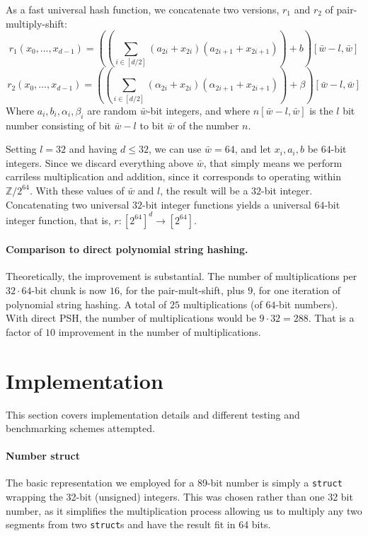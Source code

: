 \documentclass[]{article}
\newcommand{\funk}[1]{\small\texttt{#1}}
\begin{document}
As a fast universal hash function, we concatenate two versions, $r_1$ and $r_2$ of pair-multiply-shift:
\[r_1(x_0,\ldots ,x_{d-1}) = \left(\left(\sum_{i\in [d/2]}(a_{2i} + x_{2i})(a_{2i+1} + x_{2i+1}) \right)+b \right) [\bar{w}-l,\bar{w}]\]
\[r_2(x_0,\ldots ,x_{d-1}) = \left(\left(\sum_{i\in [d/2]}(\alpha_{2i} + x_{2i})(\alpha_{2i+1} + x_{2i+1}) \right)+\beta \right) [\bar{w}-l,\bar{w}]\]
Where $a_i,b_i,\alpha_i,\beta_i$ are random $\bar{w}$-bit integers, and where $n[\bar{w}-l,\bar{w}]$ is the $l$ bit number consisting of bit $\bar{w}-l$ to bit $\bar{w}$ of the number $n$.

Setting $l = 32$ and having $d\leq 32$, we can use $\bar{w} = 64$, and let $x_i,a_i,b$ be $64$-bit integers. Since we discard everything above $\bar{w}$, that simply means we perform carriless multiplication and addition, since it corresponds to operating within $\mathbb{Z}/2^{64}$. With these values of $\bar{w}$ and $l$, the result will be a $32$-bit integer. Concatenating two universal $32$-bit integer functions yields a universal $64$-bit integer function, that is, $r: [2^{64}]^d \to [2^{64}]$.

\paragraph{Comparison to direct polynomial string hashing.} Theoretically, the improvement is substantial. The number of multiplications per $32\cdot 64$-bit chunk is now $16$, for the pair-mult-shift, plus $9$, for one iteration of polynomial string hashing. A total of $25$ multiplications (of $64$-bit numbers). With direct PSH, the number of multiplications would be $9\cdot 32 = 288$. That is a factor of $10$ improvement in the number of multiplications.

\section{Implementation}

This section covers implementation details and different testing and benchmarking schemes attempted.

\paragraph{Number struct}

The basic representation we employed for a 89-bit number is simply a \funk{struct} wrapping the 32-bit (unsigned) integers. This was chosen rather than one 32 bit number, as it simplifies the multiplication process allowing us to multiply any two segments from two \funk{struct}s and have the result fit in 64 bits.
\end{document}
